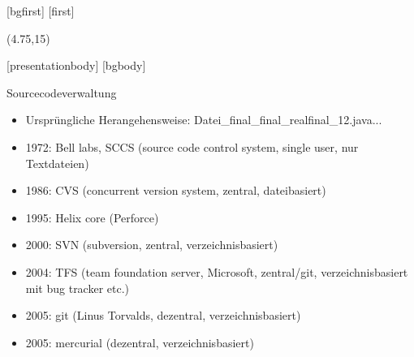 [bgfirst]
[first]
\subtitle{\theslidesection: Technische Grundlagen}
\begin{frame}[noframenumbering]
    \titlepage
    \begin{textblock}{10}(4.75,15)
        \cite{ProgrammingLogo}
    \end{textblock}
\end{frame}
[presentationbody] 
[bgbody]

\begin{frame}{Sourcecodeverwaltung}
    \begin{itemize}
        \item Ursprüngliche Herangehensweise: Datei\_final\_final\_realfinal\_12.java...
        \item<2-> 1972: Bell labs, SCCS (source code control system, single user, nur Textdateien)
        \item<3-> 1986: CVS (concurrent version system, zentral, dateibasiert)
        \item<4-> 1995: Helix core (Perforce)
        \item<5-> 2000: SVN (subversion, zentral, verzeichnisbasiert)
        \item<6-> 2004: TFS (team foundation server, Microsoft, zentral/git, verzeichnisbasiert mit bug tracker etc.)
        \item<7-> 2005: git (Linus Torvalds, dezentral, verzeichnisbasiert)
        \item<8-> 2005: mercurial (dezentral, verzeichnisbasiert)
    \end{itemize}
\end{frame}

